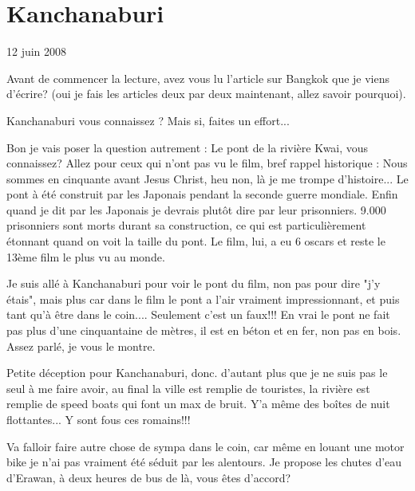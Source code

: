 \section{Kanchanaburi}

12 juin 2008

\begin{multicols}{2}

Avant de commencer la lecture, avez vous lu l'article sur Bangkok que je viens d'écrire? (oui je fais les articles deux par deux maintenant, allez savoir pourquoi).

Kanchanaburi vous connaissez ? Mais si, faites un effort...

Bon je vais poser la question autrement : Le pont de la rivière Kwai, vous connaissez? Allez pour ceux qui n'ont pas vu le film, bref rappel historique : Nous sommes en cinquante avant Jesus Christ, heu non, là je me trompe d'histoire... Le pont à été construit par les Japonais pendant la seconde guerre mondiale. Enfin quand je dit par les Japonais je devrais plutôt dire par leur prisonniers. 9.000 prisonniers sont morts durant sa construction, ce qui est particulièrement étonnant quand on voit la taille du pont. Le film, lui, a eu 6 oscars et reste le 13ème film le plus vu au monde.

Je suis allé à Kanchanaburi pour voir le pont du film, non pas pour dire "j'y étais", mais plus car dans le film le pont a l'air vraiment impressionnant, et puis tant qu'à être dans le coin.... Seulement c'est un faux!!! En vrai le pont ne fait pas plus d'une cinquantaine de mètres, il est en béton et en fer, non pas en bois. Assez parlé, je vous le montre.



Petite déception pour Kanchanaburi, donc. d'autant plus que je ne suis pas le seul à me faire avoir, au final la ville est remplie de touristes, la rivière est remplie de speed boats qui font un max de bruit. Y'a même des boîtes de nuit flottantes... Y sont fous ces romains!!!

Va falloir faire autre chose de sympa dans le coin, car même en louant une motor bike je n'ai pas vraiment été séduit par les alentours. Je propose les chutes d'eau d'Erawan, à deux heures de bus de là, vous êtes d'accord?


\end{multicols}
